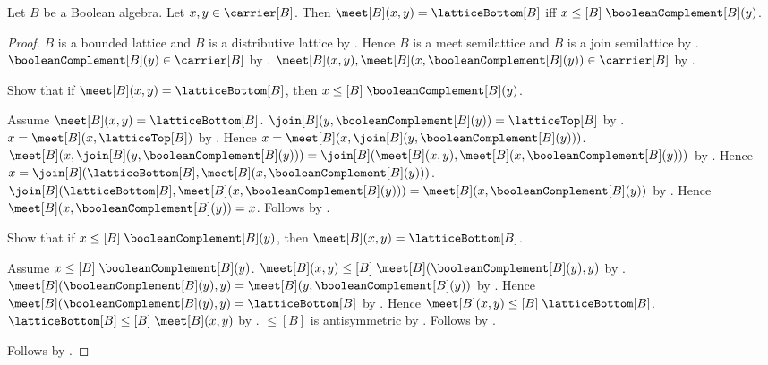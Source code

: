 \begin{theorem}\label{meet_eq_lattice_bottom_iff_leq_boolean_complement}
    Let $B$ be a Boolean algebra.
    Let $x,y\in\carrier[B]$.
    Then $\meet[B](x,y)=\latticeBottom[B]$ iff
        $x\mathrel{\leq[B]}\booleanComplement[B](y)$.
\end{theorem}
\begin{proof}
    $B$ is a bounded lattice and $B$ is a distributive lattice by
        .
    Hence $B$ is a meet semilattice and $B$ is a join semilattice by
        .
    $\booleanComplement[B](y)\in\carrier[B]$ by
        .
    $\meet[B](x,y),
        \meet[B](x,\booleanComplement[B](y))\in\carrier[B]$ by
        .

    Show that if $\meet[B](x,y)=\latticeBottom[B]$, then
        $x\mathrel{\leq[B]}\booleanComplement[B](y)$.
    \begin{subproof}
        Assume $\meet[B](x,y)=\latticeBottom[B]$.
        $\join[B](y,\booleanComplement[B](y))
            =\latticeTop[B]$ by .
        $x=\meet[B](x,\latticeTop[B])$ by .
        Hence $x=\meet[B]
            (x,\join[B](y,\booleanComplement[B](y)))$.
        $\meet[B](x,\join[B](y,\booleanComplement[B](y)))
            =\join[B]
                (\meet[B](x,y),
                 \meet[B](x,\booleanComplement[B](y)))$ by
            .
        Hence $x=\join[B]
            (\latticeBottom[B],
             \meet[B](x,\booleanComplement[B](y)))$.
        $\join[B]
            (\latticeBottom[B],
             \meet[B](x,\booleanComplement[B](y)))
            =\meet[B](x,\booleanComplement[B](y))$ by
            .
        Hence $\meet[B](x,\booleanComplement[B](y))=x$.
        Follows by .
    \end{subproof}

    Show that if $x\mathrel{\leq[B]}\booleanComplement[B](y)$,
        then $\meet[B](x,y)=\latticeBottom[B]$.
    \begin{subproof}
        Assume $x\mathrel{\leq[B]}\booleanComplement[B](y)$.
        $\meet[B](x,y)\mathrel{\leq[B]}
            \meet[B](\booleanComplement[B](y),y)$ by
            .
        $\meet[B](\booleanComplement[B](y),y)
            =\meet[B](y,\booleanComplement[B](y))$ by
            .
        Hence $\meet[B](\booleanComplement[B](y),y)
            =\latticeBottom[B]$ by .
        Hence $\meet[B](x,y)\mathrel{\leq[B]}
            \latticeBottom[B]$.
        $\latticeBottom[B]\mathrel{\leq[B]}\meet[B](x,y)$ by
            .
        $\leq[B]$ is antisymmetric by
            .
        Follows by .
    \end{subproof}
    Follows by \auto.
\end{proof}

